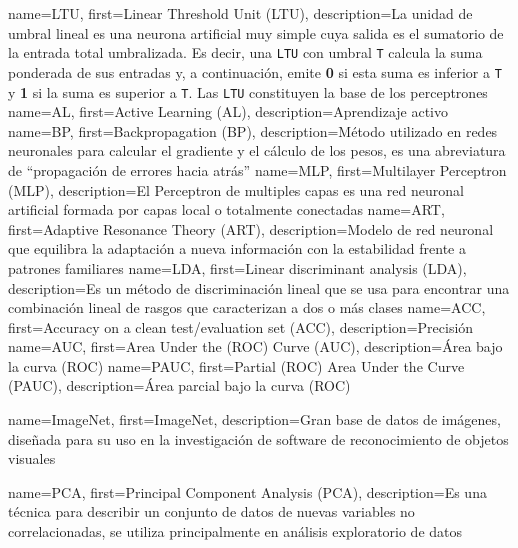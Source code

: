       {name={LTU},        first={Linear Threshold Unit (LTU)},                    description={La unidad de umbral lineal es una neurona artificial muy simple cuya salida es el sumatorio de la entrada total umbralizada. Es decir, una \texttt{LTU} con umbral \texttt{T} calcula la suma ponderada de sus entradas y, a continuación, emite \textbf{0} si esta suma es inferior a \texttt{T} y \textbf{1} si la suma es superior a \texttt{T}. Las \texttt{LTU} constituyen la base de los perceptrones \cite{mldict}}}
       {name={AL},         first={Active Learning (AL)},                           description={Aprendizaje activo}}
    {name={BP},         first={Backpropagation (BP)},                           description={Método utilizado en redes neuronales para calcular el gradiente y el cálculo de los pesos, es una abreviatura de ``propagación de errores hacia atrás''}}
      {name={MLP},        first={Multilayer Perceptron (MLP)},                    description={El Perceptron de multiples capas es una red neuronal artificial formada por capas local o totalmente conectadas}}
   {name={ART},        first={Adaptive Resonance Theory (ART)},                description={Modelo de red neuronal que equilibra la adaptación a nueva información con la estabilidad frente a patrones familiares}}
      {name={LDA},        first={Linear discriminant analysis (LDA)},             description={Es un método de discriminación lineal que se usa para encontrar una combinación lineal de rasgos que caracterizan a dos o más clases}}
      {name={ACC},        first={Accuracy on a clean test/evaluation set (ACC)},  description={Precisión}}
      {name={AUC},        first={Area Under the (ROC) Curve (AUC)},               description={Área bajo la curva (ROC)}}
     {name={PAUC},       first={Partial (ROC) Area Under the Curve (PAUC)},      description={Área parcial bajo la curva (ROC)}}

 {name={ImageNet}, first={ImageNet}, description={Gran base de datos de imágenes, diseñada para su uso en la investigación de software de reconocimiento de objetos visuales}}

  {name={PCA}, first={Principal Component Analysis (PCA)}, description={Es una técnica para describir un conjunto de datos de nuevas variables no correlacionadas, se utiliza principalmente en análisis exploratorio de datos}}


